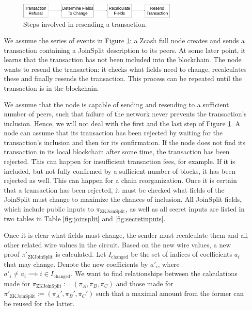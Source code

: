 \documentclass{article}
\begin{document}
\begin{figure}[t]
\includegraphics[width=8cm]{images/timeline.png}
\caption{Steps involved in resending a transaction.} \label{fig:resend-steps}
\centering
\end{figure}

We assume the series of events in Figure \ref{fig:resend-steps}: a Zcash full node creates and sends a transaction containing a JoinSplit description to its peers.
At some later point, it learns that the transaction has not been included into the blockchain.
The node wants to resend the transaction: it checks what fields need to change, recalculates these and finally resends the transaction.
This process can be repeated until the transaction is in the blockchain.

We assume that the node is capable of sending and resending to a sufficient number of peers, such that failure of the network never prevents the transaction's inclusion.
Hence, we will not deal with the first and the last step of Figure \ref{fig:resend-steps}.
A node can assume that its transaction has been rejected by waiting for the transaction's inclusion and then for its confirmation.
If the node does not find its transaction in its local blockchain after some time, the transaction has been rejected.
This can happen for insufficient transaction fees, for example.
If it is included, but not fully confirmed by a sufficient number of blocks, it has been rejected as well.
This can happen for a chain reorganization.
Once it is certain that a transaction has been rejected, it must be checked what fields of the JoinSplit must change to maximize the chances of inclusion.
All JoinSplit fields, which include public inputs to $\pi_\text{ZKJoinSplit}$, as well as all secret inputs are listed in two tables in Table \ref{fig:joinsplit} and \ref{fig:secretinputs}.

Once it is clear what fields must change, the sender must recalculate them and all other related wire values in the circuit.
Based on the new wire values, a new proof $\pi'_\text{ZKJoinSplit}$ is calculated.
Let $I_\text{changed}$ be the set of indices of coefficients $a_i$ that may change.
Denote the new coefficients by $a'_i$, where $a'_i \neq a_i \implies i \in I_\text{changed}$.
We want to find relationships between the calculations made for $\pi_\text{ZKJoinSplit} := (\pi_A, \pi_B, \pi_C)$ and those made for $\pi'_\text{ZKJoinSplit} := (\pi_A', \pi_B', \pi_C')$ such that a maximal amount from the former can be reused for the latter.
\end{document}
